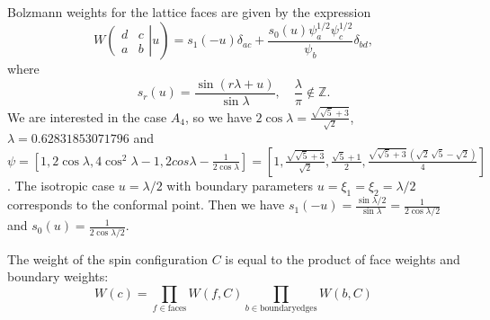 \documentclass[12pt]{article}
\begin{document}
Bolzmann  weights for the lattice faces are given by the expression
\begin{equation}
  \label{eq:5}
  W\left.\left(
    \begin{array}{cc}
      d & c\\
      a & b
    \end{array}\right| u \right)
= s_1 (-u)\delta_{ac} + \frac{s_0 (u) \psi_a^{1/2}
  \psi_c^{1/2}}{\psi_b} \delta_{bd},
\end{equation}
where
  \begin{equation}
    \label{eq:6}
    s_r(u)=\frac{\sin(r\lambda+u)}{\sin\lambda},\quad \frac{\lambda}{\pi}\not\in\mathbb{Z}.
  \end{equation}
We are interested in the case $A_4$, so we have
$2\cos\lambda=\frac{\sqrt{\sqrt{5}+3}}{\sqrt{2}}$,
$\lambda=0.62831853071796$ and $\psi=\left[1,2\cos\lambda,
  4\cos^2\lambda-1, 2cos\lambda-\frac{1}{2\cos\lambda}\right]=\left[1,\frac{\sqrt{\sqrt{5}+3}}{\sqrt{2}},\frac{\sqrt{5}+1}{2},\frac{\sqrt{\sqrt{5}+3}\,\left( \sqrt{2}\,\sqrt{5}-\sqrt{2}\right) }{4}\right]$.
The isotropic case $u=\lambda/2$ with boundary parameters
$u=\xi_1=\xi_2=\lambda/2$ corresponds to the  conformal point. Then we have
$s_1(-u)=\frac{\sin\lambda/2}{\sin\lambda}=\frac{1}{2\cos\lambda/2}$ and $s_0(u)=\frac{1}{2\cos\lambda/2}$.

The weight of the spin configuration $C$ is equal to the product of
face weights and boundary weights:
\begin{equation}
  \label{eq:7}
  W(c)=\prod_{f\in \mathrm{faces}} W(f,C) \prod_{b\in \mathrm{boundary
      edges}} W(b,C)
\end{equation}
\end{document}
